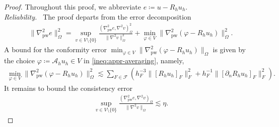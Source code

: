 \documentclass[a4paper]{amsart}
\numberwithin{equation}{section}
\def\F{\mathcal{F}}
\def\T{\mathcal{T}}
\def\pw{\mathrm{pw}}
\theoremstyle{definition}
\theoremstyle{remark}
\numberwithin{theorem}{section}
\numberwithin{equation}{section}
\numberwithin{table}{section}
\numberwithin{figure}{section}
\begin{document}
\begin{proof}
Throughout this proof, we abbreviate $e \coloneqq u - R_h u_h$.\\[-0.5em]

\noindent\emph{Reliability.~}
The proof departs from the error decomposition \cite[Theorem 1]{CarstensenGallistlHu2013}
\begin{align}\label{eq:proof-a-post-split}
	\|\nabla_\pw^2 e\|_\Omega^2 = \sup_{v \in V\setminus\{0\}} \frac{(\nabla_\pw^2 e, \nabla^2 v)_\Omega^2}{\|\nabla^2 v\|_\Omega^2}
	+ \min_{\varphi \in V}\|\nabla^2_\pw (\varphi - R_h u_h)\|_\Omega^2.
\end{align}
A bound for the conformity error $\min_{\varphi \in V}\|\nabla^2_\pw (\varphi - R_h u_h)\|_\Omega$ is given by the choice $\varphi \coloneqq \mathcal{A}_h u_h \in V$ in \eqref{ineq:appr-averaging}, namely,
\begin{align}\label{ineq:proof-a-post-conformity-error}
	\min_{\varphi \in V}\|\nabla^2_\pw (\varphi - R_h u_h)\|_\Omega^2 \lesssim \sum_{F \in \F} (h_F^{-3}\|[R_h u_h]_F\|_F^2 + h_F^{-1}\|[\partial_n R_h u_h]_F\|_F^2).
\end{align}
It remains to bound the consistency error
\begin{align}\label{ineq:proof-a-post-consistency-error}
	\sup_{v \in V\setminus\{0\}} \frac{(\nabla_\pw^2 e, \nabla^2 v)_\Omega}{\|\nabla^2 v\|_\Omega} \lesssim \eta.
\end{align}

\end{proof}
\end{document}
